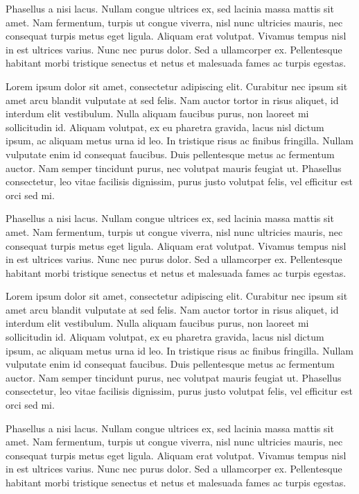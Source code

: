 \documentclass[
  letterpaper,
  DIV=11,
  numbers=noendperiod]{scrreprt}
\begin{document}
Phasellus a nisi lacus. Nullam congue ultrices ex, sed lacinia massa
mattis sit amet. Nam fermentum, turpis ut congue viverra, nisl nunc
ultricies mauris, nec consequat turpis metus eget ligula. Aliquam erat
volutpat. Vivamus tempus nisl in est ultrices varius. Nunc nec purus
dolor. Sed a ullamcorper ex. Pellentesque habitant morbi tristique
senectus et netus et malesuada fames ac turpis egestas.

Lorem ipsum dolor sit amet, consectetur adipiscing elit. Curabitur nec
ipsum sit amet arcu blandit vulputate at sed felis. Nam auctor tortor in
risus aliquet, id interdum elit vestibulum. Nulla aliquam faucibus
purus, non laoreet mi sollicitudin id. Aliquam volutpat, ex eu pharetra
gravida, lacus nisl dictum ipsum, ac aliquam metus urna id leo. In
tristique risus ac finibus fringilla. Nullam vulputate enim id consequat
faucibus. Duis pellentesque metus ac fermentum auctor. Nam semper
tincidunt purus, nec volutpat mauris feugiat ut. Phasellus consectetur,
leo vitae facilisis dignissim, purus justo volutpat felis, vel efficitur
est orci sed mi.

Phasellus a nisi lacus. Nullam congue ultrices ex, sed lacinia massa
mattis sit amet. Nam fermentum, turpis ut congue viverra, nisl nunc
ultricies mauris, nec consequat turpis metus eget ligula. Aliquam erat
volutpat. Vivamus tempus nisl in est ultrices varius. Nunc nec purus
dolor. Sed a ullamcorper ex. Pellentesque habitant morbi tristique
senectus et netus et malesuada fames ac turpis egestas.

Lorem ipsum dolor sit amet, consectetur adipiscing elit. Curabitur nec
ipsum sit amet arcu blandit vulputate at sed felis. Nam auctor tortor in
risus aliquet, id interdum elit vestibulum. Nulla aliquam faucibus
purus, non laoreet mi sollicitudin id. Aliquam volutpat, ex eu pharetra
gravida, lacus nisl dictum ipsum, ac aliquam metus urna id leo. In
tristique risus ac finibus fringilla. Nullam vulputate enim id consequat
faucibus. Duis pellentesque metus ac fermentum auctor. Nam semper
tincidunt purus, nec volutpat mauris feugiat ut. Phasellus consectetur,
leo vitae facilisis dignissim, purus justo volutpat felis, vel efficitur
est orci sed mi.

Phasellus a nisi lacus. Nullam congue ultrices ex, sed lacinia massa
mattis sit amet. Nam fermentum, turpis ut congue viverra, nisl nunc
ultricies mauris, nec consequat turpis metus eget ligula. Aliquam erat
volutpat. Vivamus tempus nisl in est ultrices varius. Nunc nec purus
dolor. Sed a ullamcorper ex. Pellentesque habitant morbi tristique
senectus et netus et malesuada fames ac turpis egestas.
\end{document}

